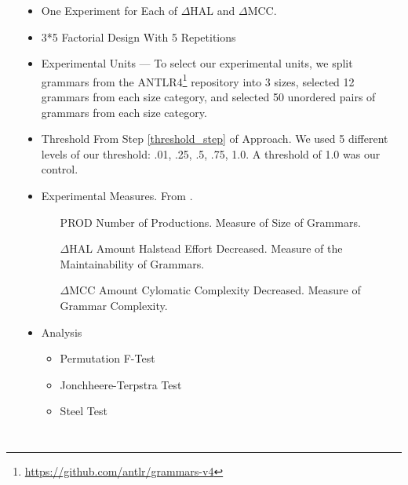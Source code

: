 \documentclass[17pt,margin=1in,innermargin=-4.5in,blockverticalspace=-0.25in]{tikzposter}
\begin{document}
\begin{columns}
{\begin{minipage}[t]{.33\linewidth}
\begin{tikzfigure}
            \end{tikzfigure}
        \end{minipage}\hfill\begin{minipage}[t]{.67\linewidth}
            \begin{itemize}
                \item One Experiment for Each of $\Delta$HAL and $\Delta$MCC.
                \item 3*5 Factorial Design With 5 Repetitions
                \item Experimental Units --- To select our experimental units, we split
                grammars from the ANTLR4\footnote{\url{https://github.com/antlr/grammars-v4}} repository into 3 sizes, selected 12 grammars
                from each size category, and selected 50 unordered pairs of grammars from each
                size category.
                \item Threshold From Step \ref{threshold_step} of Approach. We used 5 different levels
                of our threshold: .01, .25, .5, .75, 1.0. A threshold of 1.0 was our control.
                \item Experimental Measures. From \cite{powerMetricsSuiteGrammarbased2004}.
                    \begin{itemize}
                        \item[PROD] Number of Productions. Measure of Size of Grammars.
                        \item[$\Delta$HAL] Amount Halstead Effort Decreased. Measure of the Maintainability of Grammars.
                        \item[$\Delta$MCC] Amount Cylomatic Complexity Decreased. Measure of Grammar Complexity.
                    \end{itemize}
                \item Analysis
                    \begin{itemize}
                        \item Permutation F-Test
                        \item Jonchheere-Terpstra Test
                        \item Steel Test
                    \end{itemize}
            \end{itemize}
        \end{minipage}
    }
\end{columns}
\end{document}
